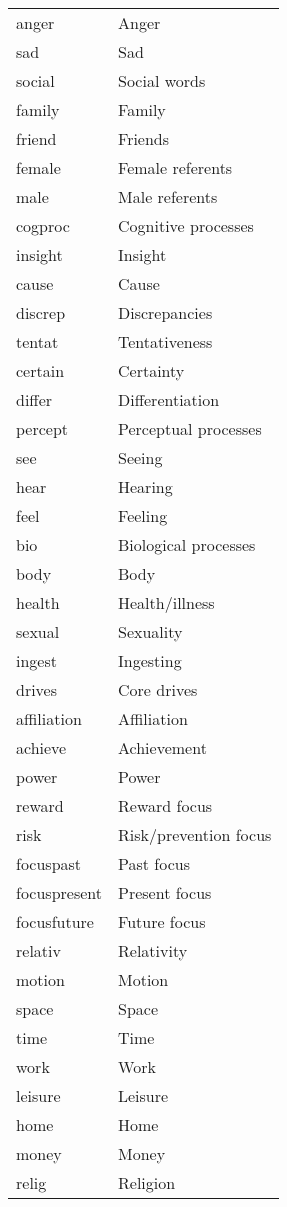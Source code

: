 \documentclass[../thesis.tex]{subfiles}
\begin{document}
\begin{longtable}[t]{ll}
anger & Anger\\
sad & Sad\\
\addlinespace
social & Social words\\
family & Family\\
friend & Friends\\
female & Female referents\\
male & Male referents\\
\addlinespace
cogproc & Cognitive processes\\
insight & Insight\\
cause & Cause\\
discrep & Discrepancies\\
tentat & Tentativeness\\
\addlinespace
certain & Certainty\\
differ & Differentiation\\
percept & Perceptual processes\\
see & Seeing\\
hear & Hearing\\
\addlinespace
feel & Feeling\\
bio & Biological processes\\
body & Body\\
health & Health/illness\\
sexual & Sexuality\\
\addlinespace
ingest & Ingesting\\
drives & Core drives\\
affiliation & Affiliation\\
achieve & Achievement\\
power & Power\\
\addlinespace
reward & Reward focus\\
risk & Risk/prevention focus\\
focuspast & Past focus\\
focuspresent & Present focus\\
focusfuture & Future focus\\
\addlinespace
relativ & Relativity\\
motion & Motion\\
space & Space\\
time & Time\\
work & Work\\
\addlinespace
leisure & Leisure\\
home & Home\\
money & Money\\
relig & Religion\\

\end{longtable}
\end{document}
